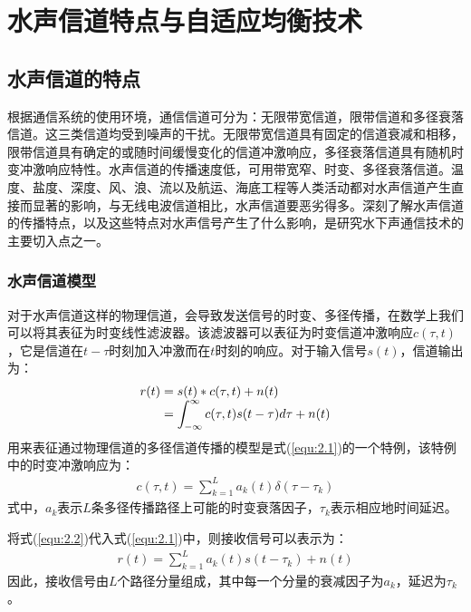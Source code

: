 %
\chapter{水声信道特点与自适应均衡技术}
\thispagestyle{empty}
\section{水声信道的特点}
根据通信系统的使用环境，通信信道可分为：无限带宽信道，限带信道和多径衰落信道\citep{ProakisB2001}。这三类信道均受到噪声的干扰。无限带宽信道具有固定的信道衰减和相移，限带信道具有确定的或随时间缓慢变化的信道冲激响应，多径衰落信道具有随机时变冲激响应特性。水声信道的传播速度低，可用带宽窄、时变、多径衰落信道。温度、盐度、深度、风、浪、流以及航运、海底工程等人类活动都对水声信道产生直接而显著的影响，与无线电波信道相比，水声信道要恶劣得多。深刻了解水声信道的传播特点，以及这些特点对水声信号产生了什么影响，是研究水下声通信技术的主要切入点之一。
\subsection{水声信道模型}
对于水声信道这样的物理信道，会导致发送信号的时变、多径传播，在数学上我们可以将其表征为时变线性滤波器。该滤波器可以表征为时变信道冲激响应$c(\tau,t)$，它是信道在$t-\tau$时刻加入冲激而在$t$时刻的响应。对于输入信号$s(t)$，信道输出为：
\begin{eqnarray}
    \begin{array}{l@{\;=\;}l}
        r(t)&s(t)*c(\tau,t)+n(t)\\
        &\displaystyle\int_{-\infty}^{\infty}c(\tau,t)s(t-\tau)d\tau+n(t)\\
    \end{array}
    \label{equ:2.1}
\end{eqnarray}
用来表征通过物理信道的多径信道传播的模型是式(\ref{equ:2.1})的一个特例，该特例中的时变冲激响应为：
\begin{eqnarray}
    c(\tau,t)=\sum_{k=1}^La_k(t)\delta(\tau-\tau_k)
    \label{equ:2.2}
\end{eqnarray}
式中，$a_k$表示$L$条多径传播路径上可能的时变衰落因子，$\tau_k$表示相应地时间延迟。

将式(\ref{equ:2.2})代入式(\ref{equ:2.1})中，则接收信号可以表示为：
\begin{eqnarray}
    r(t)=\sum_{k=1}^La_k(t)s(t-\tau_k)+n(t)
    \label{equ:2.3}
\end{eqnarray}
因此，接收信号由$L$个路径分量组成，其中每一个分量的衰减因子为$a_k$，延迟为$\tau_k$。

